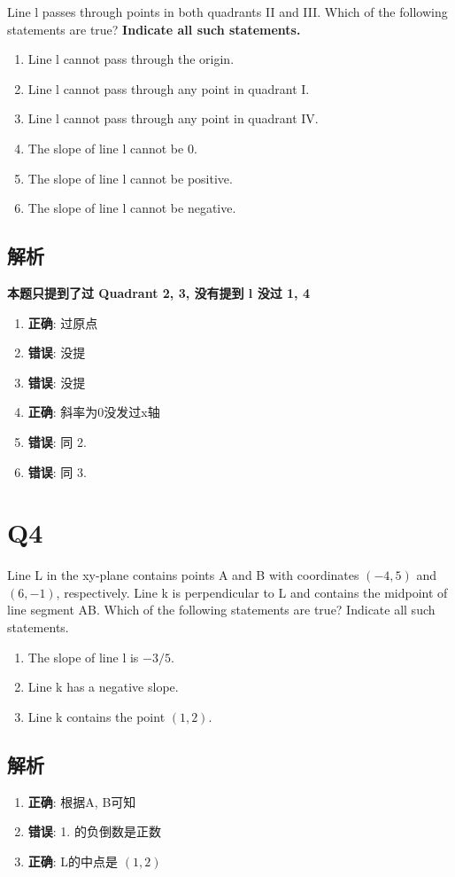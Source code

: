   Line l passes through points in both quadrants II and III.
  Which of the following statements are true?
  \textbf{Indicate all such statements.}

  \begin{enumerate}
    \item Line l cannot pass through the origin.
    \item Line l cannot pass through any point in quadrant I.
    \item Line l cannot pass through any point in quadrant IV.
    \item The slope of line l cannot be 0.
    \item The slope of line l cannot be positive.
    \item The slope of line l cannot be negative.
  \end{enumerate}

  \subsection{解析}

    \textbf{本题只提到了过 Quadrant 2, 3, 没有提到 l 没过 1, 4}

    \begin{enumerate}
      \item \textbf{正确}: 过原点
      \item \textbf{错误}: 没提
      \item \textbf{错误}: 没提
      \item \textbf{正确}: 斜率为0没发过x轴
      \item \textbf{错误}: 同 2.
      \item \textbf{错误}: 同 3.
    \end{enumerate}

\section{Q4}

  Line L in the xy-plane contains points A and B with coordinates
  $ (-4, 5) $ and $ (6, -1) $, respectively.
  Line k is perpendicular to L and contains the midpoint of line segment AB.
  Which of the following statements are true? Indicate all such statements.

  \begin{enumerate}
    \item The slope of line l is $ -3/5 $.
    \item Line k has a negative slope.
    \item Line k contains the point $ (1,2) $.
  \end{enumerate}

  \subsection{解析}

    \begin{enumerate}
      \item \textbf{正确}: 根据A, B可知
      \item \textbf{错误}: 1. 的负倒数是正数
      \item \textbf{正确}: L的中点是 $ (1, 2) $
    \end{enumerate}
